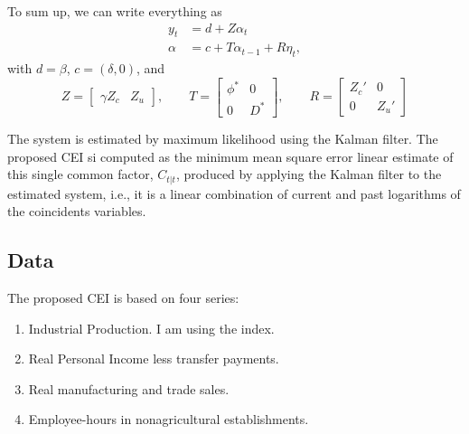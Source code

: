 To sum up, we can write everything as 
\begin{equation}
	\begin{aligned}
		y_t &= d + Z\alpha_t \\
		\alpha &= c + T\alpha_{t-1} + R\eta_t,
	\end{aligned}
\end{equation}
with $d=\beta$, $c=(\delta, 0)$, and
\begin{equation}
	Z = \begin{bmatrix}
		\gamma Z_c & Z_u 
	\end{bmatrix}, \quad\quad T = \begin{bmatrix}
		\phi^\ast & 0 \\
		0 &D^\ast  
	\end{bmatrix}, \quad\quad R = \begin{bmatrix}
		Z_c' & 0 \\ 0 & Z_u'
	\end{bmatrix}
\end{equation}

The system is estimated by maximum likelihood using the Kalman filter. The proposed CEI si computed as the minimum mean square error linear estimate of this single common factor, $C_{t|t}$, produced by applying the Kalman filter to the estimated system, i.e., it is a linear combination of current and past logarithms of the coincidents variables.

\subsection{Data}

The proposed CEI is based on four series:
\begin{enumerate}
	\item Industrial Production. I am using the index.
	\item Real Personal Income less transfer payments.
	\item Real manufacturing and trade sales.
	\item Employee-hours in nonagricultural establishments.
\end{enumerate}